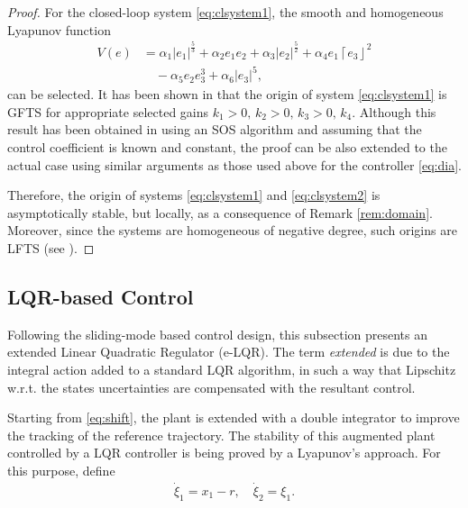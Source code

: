 \documentclass[journal,twoside,web]{ieeecolor}
\newcommand{\Sabs}[1]{\left\lceil #1 \right\rfloor}
\newcommand{\abs}[1]{\left| #1 \right|}
\begin{document}
\begin{proof}
For the closed-loop system \eqref{eq:clsystem1}, the smooth and homogeneous Lyapunov function
\begin{align*}
V(e) &= \alpha_{1}\abs{e_{1}}^{\frac{5}{3}}+\alpha_{2}e_{1}e_{2}+\alpha_{3}\abs{e_{2}}^{\frac{5}{2}}+\alpha_{4}e_{1}\Sabs{e_{3}}^{2}\\
&\quad -\alpha_{5}e_{2}e_{3}^{3}+\alpha_{6}\abs{e_{3}}^{5},
\end{align*}
can be selected. It has been shown in \cite{b:Torres-Sanchez-Fridman-Moreno} that the origin of system \eqref{eq:clsystem1} is GFTS for appropriate selected gains $k_{1}>0,\,k_{2}>0,\,k_{3}>0,\,k_{4}$. Although this result has been obtained in \cite{b:Torres-Sanchez-Fridman-Moreno} using an SOS algorithm and assuming that the control coefficient is known and constant, the proof can be also extended to the actual case using similar arguments as those used above for the controller \eqref{eq:dia}. 

Therefore, the origin of systems \eqref{eq:clsystem1} and \eqref{eq:clsystem2} is asymptotically stable, but locally, as a consequence of Remark \ref{rem:domain}. Moreover, since the systems are homogeneous of negative degree, such origins are LFTS (see \cite{b:levant_automatica2005}).

\end{proof}

\subsection{LQR-based Control}

Following the sliding-mode based control design, this subsection presents an extended Linear Quadratic Regulator (e-LQR). The term \textit{extended} is due to the integral action added to a standard LQR algorithm, in such a way that Lipschitz w.r.t. the states uncertainties are compensated with the resultant control. 

Starting from \eqref{eq:shift}, the plant is extended with a double integrator to improve the tracking of the reference trajectory. The stability of this augmented plant controlled by a LQR controller is being proved by a Lyapunov's approach. For this purpose, define
\begin{equation}
\begin{split}
  \dot{\xi}_1 = x_1 - r, \quad
  \dot{\xi}_2 = \xi_1 .
\end{split}
\label{eq:double_integrator}
\end{equation}
\end{document}
